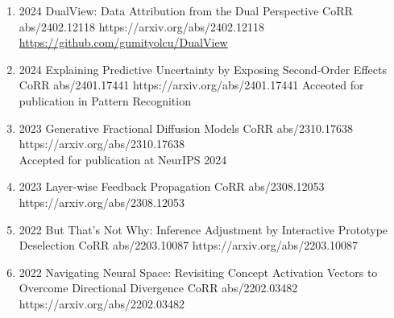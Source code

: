 {\begin{enumerate}
        \item {}
                        {2024}
                        {DualView: Data Attribution from the Dual Perspective}
                        {CoRR abs/2402.12118}
                        {https://arxiv.org/abs/2402.12118}
                        {\\\href{https://github.com/gumityolcu/DualView}{https://github.com/gumityolcu/DualView}}

        \item {}
                        {2024}
                        {Explaining Predictive Uncertainty by Exposing Second-Order Effects}
                        {CoRR abs/2401.17441}
                        {https://arxiv.org/abs/2401.17441}
                        {Acceoted for publication in Pattern Recognition}

        \item {}
                        {2023}
                        {Generative Fractional Diffusion Models}
                        {CoRR abs/2310.17638}
                        {https://arxiv.org/abs/2310.17638}
                        {\\Accepted for publication at NeurIPS 2024}

        \item {}
                        {2023}
                        {Layer-wise Feedback Propagation}
                        {CoRR abs/2308.12053}
                        {https://arxiv.org/abs/2308.12053}

        \item {}
                        {2022}
                        {But That's Not Why: Inference Adjustment by Interactive Prototype Deselection}
                        {CoRR abs/2203.10087}
                        {https://arxiv.org/abs/2203.10087}

        \item {}
                        {2022}
                        {Navigating Neural Space: Revisiting Concept Activation Vectors to Overcome Directional Divergence}
                        {CoRR abs/2202.03482}
                        {https://arxiv.org/abs/2202.03482}


\end{enumerate}}
